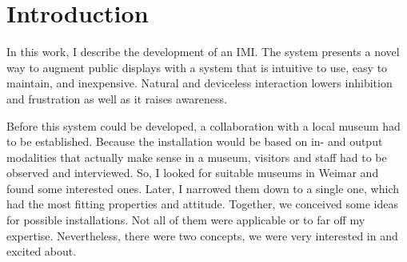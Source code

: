 \chapter{Introduction}
\label{introduction}


In this work, I describe the development of an \ac{IMI}. The system presents a novel way to augment public displays with a system that is intuitive to use, easy to maintain, and inexpensive. Natural and deviceless interaction lowers inhibition and frustration as well as it raises awareness.

Before this system could be developed, a collaboration with a local museum had to be established. Because the installation would be based on in- and output modalities that actually make sense in a museum, visitors and staff had to be observed and interviewed. So, I looked for suitable museums in Weimar and found some interested ones. Later, I narrowed them down to a single one, which had the most fitting properties and attitude. Together, we conceived some ideas for possible installations. Not all of them were applicable or to far off my expertise. Nevertheless, there were two concepts, we were very interested in and excited about.

